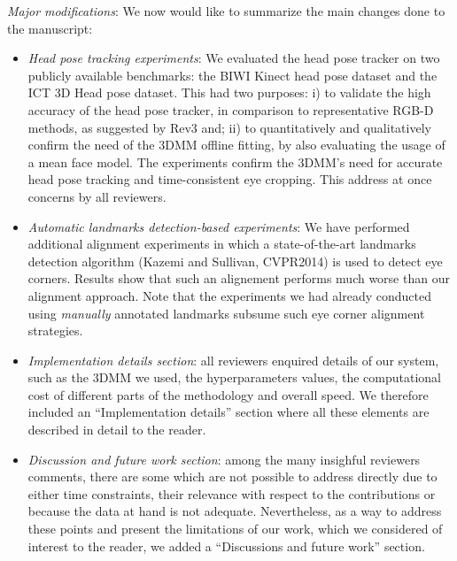 \documentclass[12pt]{article}
\begin{document}
{\noindent \em Major modifications}: We now would like to summarize the main changes done to the manuscript:

\begin{itemize}
 \item {\em Head pose tracking experiments}: We evaluated the head pose tracker on two publicly available benchmarks: the BIWI Kinect head pose
 dataset and the ICT 3D Head pose dataset. This had two purposes: i) to validate the high accuracy of the head pose tracker, in comparison to representative
 RGB-D methods, as suggested by Rev3 and; ii) to quantitatively and qualitatively confirm the need of the 3DMM offline fitting, by also evaluating
 the usage of a mean face model. The experiments confirm the 3DMM's need for accurate head pose tracking and time-consistent
 eye cropping. This address at once concerns by all reviewers.
%
 \item {\em Automatic landmarks detection-based experiments}: We have performed additional alignment experiments in which a 
state-of-the-art landmarks detection  algorithm (Kazemi and Sullivan, CVPR2014) is used to detect eye corners.
%
Results show that such an alignement performs much worse than our alignment approach. 
%
Note that the experiments we had already conducted using {\em manually} annotated landmarks subsume such eye corner alignment strategies.
%
 \item {\em Implementation details section}: all reviewers enquired details of our system, such as the 3DMM we used,
 the hyperparameters values, the computational cost of different parts of the methodology and overall speed. We therefore included
 an ``Implementation details'' section where all these elements are described in detail to the reader.
% 
\item {\em Discussion and future work section}: among the many insighful reviewers comments, there are some which
 are not possible to address directly due to either time constraints, their relevance with respect to the contributions or because
 the data at hand is not adequate. Nevertheless, as a way to address these points and present the limitations of our work, 
which we considered of interest to  the reader, we added a ``Discussions and future work'' section. 
\end{itemize}
\end{document}
